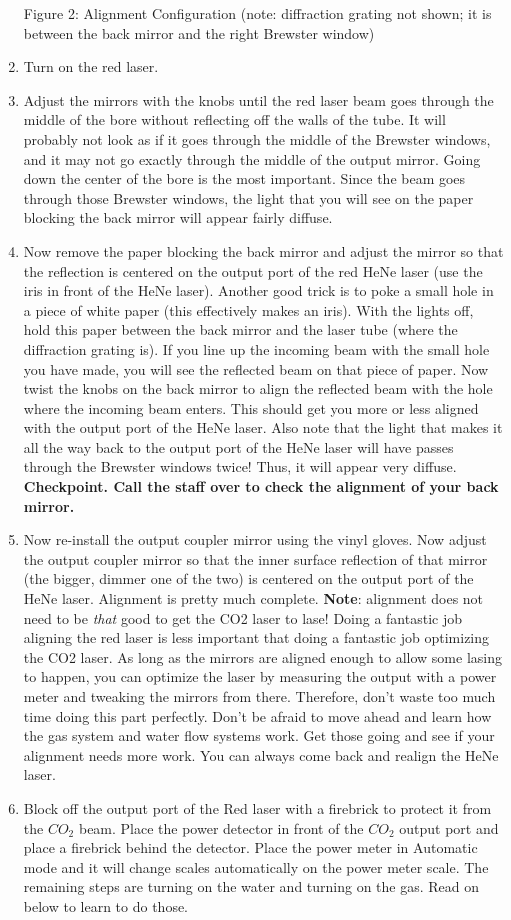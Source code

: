 \documentclass{../lab}
\begin{document}
\begin{enumerate}
Figure 2: Alignment Configuration (note: diffraction grating not shown; it is between the back mirror and the right Brewster window)
    \item Turn on the red laser.
    \item Adjust the mirrors with the knobs until the red laser beam goes through the middle of the bore without reflecting off the walls of the tube. It will probably not look as if it goes through the middle of the Brewster windows, and it may not go exactly through the middle of the output mirror. Going down the center of the bore is the most important. Since the beam goes through those Brewster windows, the light that you will see on the paper blocking the back mirror will appear fairly diffuse.
    \item Now remove the paper blocking the back mirror and adjust the mirror so that the reflection is centered on the output port of the red HeNe laser (use the iris in front of the HeNe laser). Another good trick is to poke a small hole in a piece of white paper (this effectively makes an iris). With the lights off, hold this paper between the back mirror and the laser tube (where the diffraction grating is). If you line up the incoming beam with the small hole you have made, you will see the reflected beam on that piece of paper. Now twist the knobs on the back mirror to align the reflected beam with the hole where the incoming beam enters. This should get you more or less aligned with the output port of the HeNe laser. Also note that the light that makes it all the way back to the output port of the HeNe laser will have passes through the Brewster windows twice! Thus, it will appear very diffuse.  \textbf{Checkpoint. Call the staff over to check the alignment of your back mirror.}
    \item Now re-install the output coupler mirror using the vinyl gloves. Now adjust the output coupler mirror so that the inner surface reflection of that mirror (the bigger, dimmer one of the two) is centered on the output port of the HeNe laser. Alignment is pretty much complete. \textbf{Note}: alignment does not need to be \emph{that} good to get the CO2 laser to lase! Doing a fantastic job aligning the red laser is less important that doing a fantastic job optimizing the CO2 laser. As long as the mirrors are aligned enough to allow some lasing to happen, you can optimize the laser by measuring the output with a power meter and tweaking the mirrors from there. Therefore, don't waste too much time doing this part perfectly. Don't be afraid to move ahead and learn how the gas system and water flow systems work. Get those going and see if your alignment needs more work. You can always come back and realign the HeNe laser.
    \item Block off the output port of the Red laser with a firebrick to protect it from the $CO_2 $ beam. Place the power detector in front of the $CO_2 $ output port and place a firebrick behind the detector. Place the power meter in Automatic mode and it will change scales automatically on the power meter scale. The remaining steps are turning on the water and turning on the gas. Read on below to learn to do those.
\end{enumerate}
\end{document}
